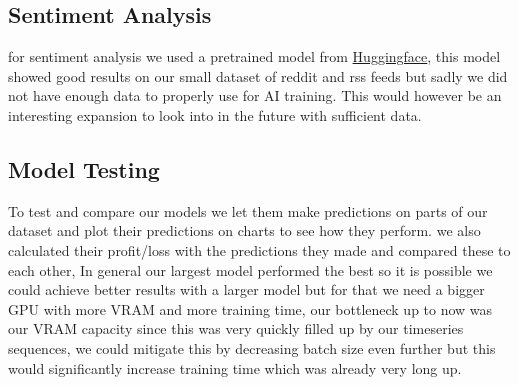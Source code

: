 \documentclass[12pt,a4paper]{article}
\begin{document}
\subsection{Sentiment Analysis}

for sentiment analysis we used a pretrained model from \href{https://huggingface.co/siebert/sentiment-roberta-large-english}{Huggingface}, this model showed good results on our small dataset of reddit and rss feeds but sadly we did not have enough data to properly use for AI training. This would however be an interesting expansion to look into in the future with sufficient data.

\subsection{Model Testing}

To test and compare our models we let them make predictions on parts of our dataset and plot their predictions on charts to see how they perform. we also calculated their profit/loss with the predictions they made and compared these to each other, In general our largest model performed the best so it is possible we could achieve better results with a larger model but for that we need a bigger GPU with more VRAM and more training time, our bottleneck up to now was our VRAM capacity since this was very quickly filled up by our timeseries sequences, we could mitigate this by decreasing batch size even further but this would significantly increase training time which was already very long up.
\end{document}
